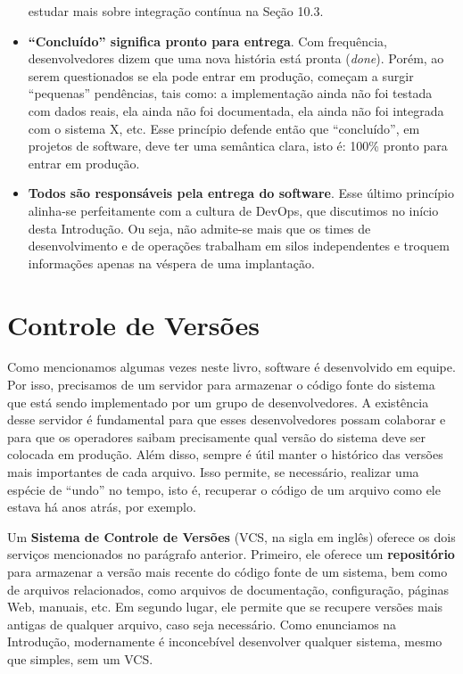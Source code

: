 \documentclass[
  11pt,
  twoside]{book}
\begin{document}
\begin{itemize}
  estudar mais sobre integração contínua na Seção 10.3.
\item
  \textbf{``Concluído'' significa pronto para entrega}. Com frequência,
  desenvolvedores dizem que uma nova história está pronta (\emph{done}).
  Porém, ao serem questionados se ela pode entrar em produção, começam a
  surgir ``pequenas'' pendências, tais como: a implementação ainda não
  foi testada com dados reais, ela ainda não foi documentada, ela ainda
  não foi integrada com o sistema X, etc. Esse princípio defende então
  que ``concluído'', em projetos de software, deve ter uma semântica
  clara, isto é: 100\% pronto para entrar em produção.
\item
  \textbf{Todos são responsáveis pela entrega do software}. Esse último
  princípio alinha-se perfeitamente com a cultura de DevOps, que
  discutimos no início desta Introdução. Ou seja, não admite-se mais que
  os times de desenvolvimento e de operações trabalham em silos
  independentes e troquem informações apenas na véspera de uma
  implantação.
\end{itemize}

\hypertarget{controle-de-versuxf5es}{%
\section{Controle de Versões}\label{controle-de-versuxf5es}}


Como mencionamos algumas vezes neste livro, software é desenvolvido em
equipe. Por isso, precisamos de um servidor para armazenar o código
fonte do sistema que está sendo implementado por um grupo de
desenvolvedores. A existência desse servidor é fundamental para que
esses desenvolvedores possam colaborar e para que os operadores saibam
precisamente qual versão do sistema deve ser colocada em produção. Além
disso, sempre é útil manter o histórico das versões mais importantes de
cada arquivo. Isso permite, se necessário, realizar uma espécie de
``undo'' no tempo, isto é, recuperar o código de um arquivo como ele
estava há anos atrás, por exemplo.

 Um \textbf{Sistema de Controle
de Versões} (VCS, na sigla em inglês) oferece os dois serviços
mencionados no parágrafo anterior. Primeiro, ele oferece um
\textbf{repositório} para armazenar a versão mais recente do código
fonte de um sistema, bem como de arquivos relacionados, como arquivos de
documentação, configuração, páginas Web, manuais, etc. Em segundo lugar,
ele permite que se recupere versões mais antigas de qualquer arquivo,
caso seja necessário. Como enunciamos na Introdução, modernamente é
inconcebível desenvolver qualquer sistema, mesmo que simples, sem um
VCS.
\end{document}
